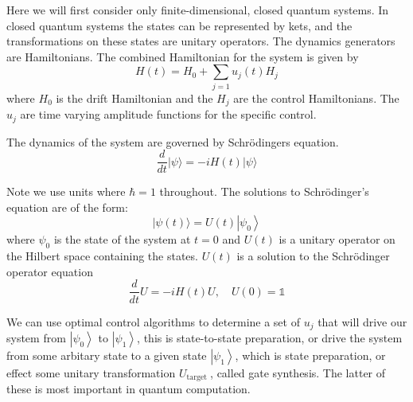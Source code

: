 \documentclass[12pt]{report}
\begin{document}
Here we will first consider only finite-dimensional, closed quantum systems. In closed quantum systems the states can be represented by kets, and the transformations on these states are unitary operators. 
The dynamics generators are Hamiltonians. The combined Hamiltonian for the system is given by
$$
H(t)=H_0+\sum_{j=1} u_j(t) H_j
$$
where $H_0$ is the drift Hamiltonian and the $H_j$ are the control Hamiltonians. The $u_j$ are time varying amplitude functions for the specific control.

The dynamics of the system are governed by Schrödingers equation.
$$
\frac{d}{d t}|\psi\rangle=-i H(t)|\psi\rangle
$$

Note we use units where $\hbar=1$ throughout. The solutions to Schrödinger's equation are of the form:
$$
|\psi(t)\rangle=U(t)\left|\psi_0\right\rangle
$$
where $\psi_0$ is the state of the system at $t=0$ and $U(t)$ is a unitary operator on the Hilbert space containing the states. 
$U(t)$ is a solution to the Schrödinger operator equation
$$
\frac{d}{d t} U=-i H(t) U, \quad U(0)=\mathbb{1}
$$

We can use optimal control algorithms to determine a set of $u_j$ that will drive our system from $\left|\psi_0\right\rangle$ to $\left|\psi_1\right\rangle$, this is state-to-state preparation, or drive the system from some arbitary state to a given state $\left|\psi_1\right\rangle$, which is state preparation, or effect some unitary transformation $U_{\text {target }}$, called gate synthesis. 
The latter of these is most important in quantum computation.

\end{document}
